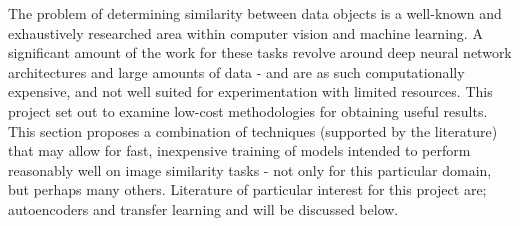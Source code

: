 The problem of determining similarity between data objects is a well-known and exhaustively researched area within computer vision and machine learning. 
A significant amount of the work for these tasks revolve around deep neural network architectures and large amounts of data - and are as such computationally expensive, and not well suited for experimentation with limited resources.
This project set out to examine low-cost methodologies for obtaining useful results. 
This section proposes a combination of techniques (supported by the literature) that may allow for fast, inexpensive training of models intended to perform reasonably well on image similarity tasks - not only for this particular domain, but perhaps many others.
Literature of particular interest for this project are; autoencoders and transfer learning and will be discussed below.

